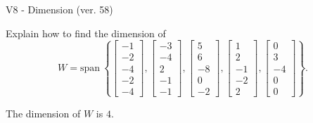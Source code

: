 \begin{exercise}
  \begin{exerciseTitle}V8 - Dimension (ver. 58)\end{exerciseTitle}
  \begin{exerciseStatement}
    Explain how to find the dimension of 
\[W=\mathrm{span}\ \left\{\left[\begin{array}{r}
-1 \\
-2 \\
-4 \\
-2 \\
-4
\end{array}\right] , \left[\begin{array}{r}
-3 \\
-4 \\
2 \\
-1 \\
-1
\end{array}\right] , \left[\begin{array}{r}
5 \\
6 \\
-8 \\
0 \\
-2
\end{array}\right] , \left[\begin{array}{r}
1 \\
2 \\
-1 \\
-2 \\
2
\end{array}\right] , \left[\begin{array}{r}
0 \\
3 \\
-4 \\
0 \\
0
\end{array}\right]\right\}.\]



  \end{exerciseStatement}
  \begin{exerciseAnswer}
   The dimension of \(W\) is  \(4\).
  


  \end{exerciseAnswer}
\end{exercise}